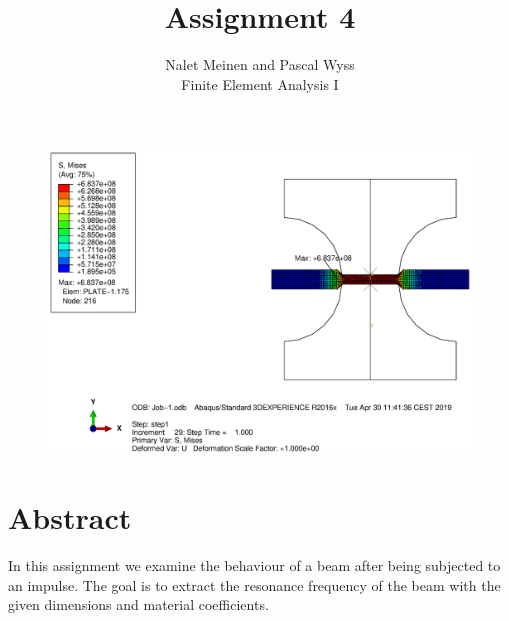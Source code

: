 \documentclass[12pt]{article}
\begin{document}


\title{Assignment 4}%
\author{Nalet Meinen and Pascal Wyss\\ %
Finite Element Analysis I
}
\maketitle

\begin{figure}[!htb]
  \centering
  \vspace*{1cm}
  \includegraphics[trim={10cm 4cm 12cm 1cm},clip,width=1.0\linewidth]{pics/titelbild}
\end{figure}

\newpage

\section*{Abstract}
In this assignment we examine the behaviour of a beam after being subjected to an impulse.
The goal is to extract the resonance frequency of the beam with the given dimensions and material coefficients.


\end{document}
